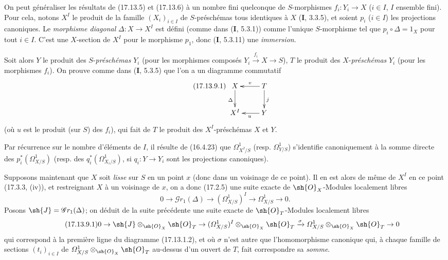 \begin{env}[17.13.9]
\label{IV.17.13.9}
On peut généraliser les résultats de (17.13.5) et (17.13.6) à un nombre fini quelconque de $S$-morphismes $f_i:Y_i\to X$ ($i\in I$, $I$ ensemble fini). Pour cela, notons $X^I$ le produit de la famille $(X_i)_{i\in I}$ de $S$-préschémas tous identiques à $X$ (\textbf{I}, 3.3.5), et soient $p_i$ ($i\in I$) les projections canoniques. Le \emph{morphisme diagonal} $\Delta:X\to X^I$ est défini (comme dans (\textbf{I}, 5.3.1)) comme l'unique $S$-morphisme tel que $p_i\circ\Delta=1_X$ pour tout $i\in I$. C'est une $X$-section de $X^I$ pour le morphisme $p_1$, donc (\textbf{I}, 5.3.11) une \emph{immersion}.


Soit alors $Y$ le produit des $S$-\emph{préschémas} $Y_i$ (pour les morphismes composés $Y_i\xrightarrow{f_i}X\to S$), $T$ le produit des $X$-\emph{préschémas} $Y_i$ (pour les morphismes $f_i$). On prouve comme dans (\textbf{I}, 5.3.5) que l'on a un diagramme commutatif
\[
\label{IV.17.13.9.1}
\tag{17.13.9.1}
\xymatrix{
  X \ar[d]_{\Delta} & T \ar[l]_-v \ar[d]^{j}\\
  X^I & Y \ar[l]^{u}
}
\]
(où $u$ est le produit (sur $S$) des $f_i$), qui fait de $T$ le produit des $X^I$-préschémas $X$ et $Y$.

Par récurrence sur le nombre d'éléments de $I$, il résulte de (16.4.23) que $\varOmega^1_{X^I/S}$ (resp. $\varOmega^1_{Y/S}$) s'identifie canoniquement à la somme directe des $p_i^*(\varOmega^1_{X/S})$ (resp. des $q_i^*(\varOmega^1_{X_i/S})$, si $q_i:Y\to Y_i$ sont les projections canoniques).

Supposons maintenant que $X$ soit \emph{lisse} sur $S$ en un point $x$ (donc dans un voisinage de ce point). Il en est alors de même de $X^I$ en ce point (17.3.3, (iv)), et restreignant $X$ à un voisinage de $x$, on a donc (17.2.5) une suite exacte de $\sh{O}_X$-Modules localement libres
\[
0\to\mathscr{G}r_1(\Delta)\to(\varOmega^1_{X/S})^I\to\varOmega^1_{X/S}\to0.
\]
Posons $\sh{J}=\mathscr{G}r_1(\Delta)$; on déduit de la suite précédente une suite exacte de $\sh{O}_T$-Modules localement libres
\[
\label{IV.17.13.9.1-seq}
\tag{17.13.9.1}
0\to\sh{J}\otimes_{\sh{O}_X}\sh{O}_T\to(\varOmega^1_{X/S})^I\otimes_{\sh{O}_X}\sh{O}_T\xrightarrow{\sigma}\varOmega^1_{X/S}\otimes_{\sh{O}_X}\sh{O}_T\to0
\]
qui correspond à la première ligne du diagramme (17.13.1.2), et où $\sigma$ n'est autre que l'homomorphisme canonique qui, à chaque famille de sections $(t_i)_{i\in I}$ de $\varOmega^1_{X/S}\otimes_{\sh{O}_X}\sh{O}_T$ au-dessus d'un ouvert de $T$, fait correspondre sa \emph{somme}.


\end{env}

